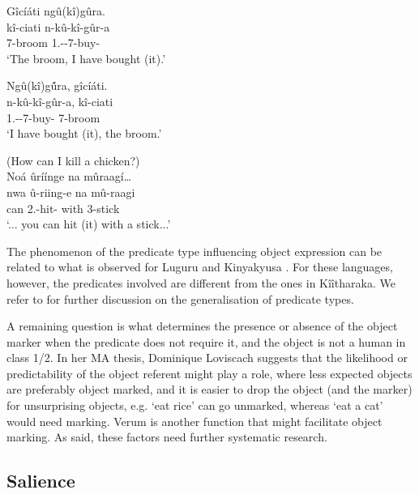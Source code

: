 \documentclass[output=paper]{langscibook}
\begin{document}
\z

\ea
\label{bkm:Ref125199236}
\ea
Gîcíáti ngû(kî)gûra.\\
\gll
kî-ciati  n-kû-kî-gûr-a\\
7-broom 1\SG.\SM-\PRS{}-7\OM{}-buy-\FV{}\\
\glt
‘The broom, I have bought (it).’

\ex
Ngû(kî)g\'{û}ra, gîcíáti.\\
\gll
n-kû-kî-gûr-a,  kî-ciati\\
1\SG.\SM-\PRS{}-7\OM{}-buy-\FV{} 7-broom\\
\glt
‘I have bought (it), the broom.’

\z
\z

\ea
\label{bkm:Ref116893481}
(How can I kill a chicken?)\\
Noá ûríínge na mûraagí…\\
\gll
nwa  û-riing-e  na  mû-raagi\\
can  2\SG.\SM{}-hit-\SBJV{} with  3-stick\\
\glt
‘... you can hit (it) with a stick...’

\z


The phenomenon of the predicate type influencing object expression can be related to what is observed for Luguru \citep{MartenRamadhani2001} and Kinyakyusa \citep{LusekeloFut}. For these languages, however, the predicates involved are different from the ones in Kîîtharaka. We refer to \citet{Kanampiu2023} for further discussion on the generalisation of predicate types.

A remaining question is what determines the presence or absence of the object marker when the predicate does not require it, and the object is not a human in class 1/2. In her MA thesis, Dominique Loviscach suggests that the likelihood or predictability of the object referent might play a role, where less expected objects are preferably object marked, and it is easier to drop the object (and the marker) for unsurprising objects, e.g. ‘eat rice’ can go unmarked, whereas ‘eat a cat’ would need marking. Verum is another function that might facilitate object marking. As said, these factors need further systematic research.

\subsection{Salience}
\end{document}
